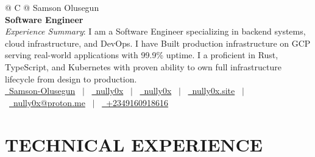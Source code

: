 \documentclass[a4paper,11pt]{article}
\begin{document}
\pagestyle{empty}



\begin{tabularx}{\linewidth}{@{} C @{}}
\Huge{Samson Olusegun} \\[7.5pt]
\textbf{Software Engineer} \\[10pt]
\normalsize{\textit{Experience Summary}: I am a Software Engineer specializing in backend systems, cloud infrastructure, and DevOps. I have Built production infrastructure on GCP serving real-world applications with 99.9\% uptime. I a proficient in Rust, TypeScript, and Kubernetes with proven ability to own full infrastructure lifecycle from design to production.} \\[10pt]
{\small \href{https://linkedin.com/in/samson-olusegun}{\raisebox{-0.04\height}\faLinkedin\ Samson-Olusegun} \  $|$ \
\href{https://twitter.com/nully0x}{\raisebox{-0.04\height}\faTwitter\ nully0x} \ $|$ \
\href{https://github.com/nully0x}{\raisebox{-0.04\height}\faGithub\ nully0x} \ $|$ \
\href{https://nully0x.site}{\raisebox{-0.04\height}\faGlobe\ nully0x.site} \ $|$ \
\href{mailto:nully0x@proton.me}{\raisebox{-0.04\height}\faEnvelope\ nully0x@proton.me} \ $|$ \
\href{tel:+2349160918616}{\raisebox{-0.04\height}\faMobile\ +2349160918616}}
\end{tabularx}


\section{TECHNICAL EXPERIENCE}
\end{document}
